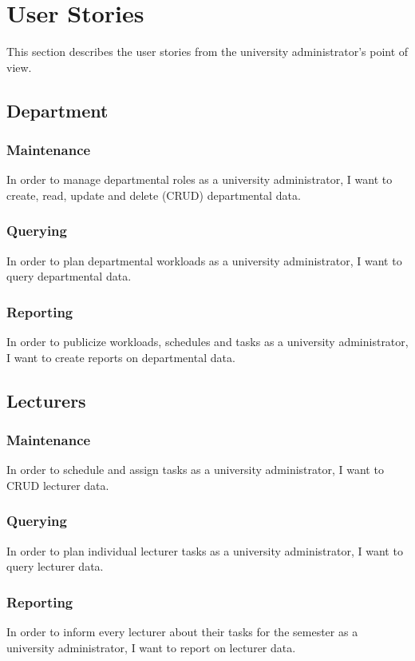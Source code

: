 \section{User Stories}
This section describes the user stories from the university administrator's point of view.

\subsection{Department}
\subsubsection{Maintenance}
In order to manage departmental roles as a university administrator, I want to
create, read, update and delete (CRUD) departmental data.

\subsubsection{Querying}
In order to plan departmental workloads as a university administrator, I want to
query departmental data.

\subsubsection{Reporting}
In order to publicize workloads, schedules and tasks as a university
administrator, I want to create reports on departmental data.

\subsection{Lecturers}
\subsubsection{Maintenance}
In order to schedule and assign tasks as a university administrator, I want to
CRUD lecturer data.

\subsubsection{Querying}
In order to plan individual lecturer tasks as a university administrator, I want
to query lecturer data.

\subsubsection{Reporting}
In order to inform every lecturer about their tasks for the semester as a
university administrator, I want to report on lecturer data.

